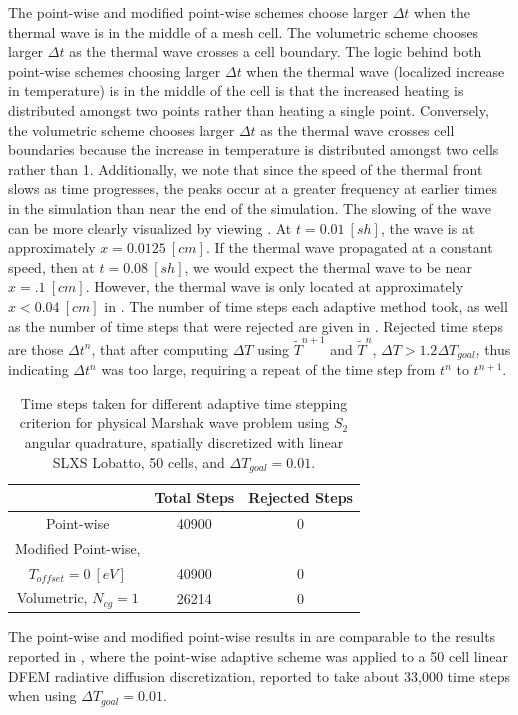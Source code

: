 The point-wise and modified point-wise schemes choose larger $\Delta t$ when the thermal wave is in the middle of a mesh cell.
The volumetric scheme chooses larger $\Delta t$ as the thermal wave crosses a cell boundary.
The logic behind both point-wise schemes choosing larger $\Delta t$ when the thermal wave (localized increase in temperature) is in the middle of the cell is that the increased heating is distributed amongst two points rather than heating a single point.
Conversely, the volumetric scheme chooses larger $\Delta t$ as the thermal wave crosses cell boundaries because the increase in temperature is distributed amongst two cells rather than 1.
Additionally, we note that since the speed of the thermal front slows as time progresses, the peaks occur at a greater frequency at earlier times in the simulation than near the end of the simulation.
The slowing of the wave can be more clearly visualized by viewing .
At $t=0.01 ~[sh]$, the wave is at approximately $x=0.0125~[cm]$.
If the thermal wave propagated at a constant speed, then at $t=0.08~[sh]$, we would expect the thermal wave to be near $x= .1~[cm]$.  
However, the thermal wave is only located at approximately $x<0.04~[cm]$ in .
The number of time steps each adaptive method took, as well as the number of time steps that were rejected are given in . 
Rejected time steps are those $\Delta t^n$, that after computing $\Delta T$ using $\widetilde{T}^{n+1}$ and $\widetilde{T}^n$, $\Delta T > 1.2 \Delta T_{goal}$, thus indicating $\Delta t^n$ was too large, requiring a repeat of the time step from $t^n$ to $t^{n+1}$.
\begin{table}[!htp]
\centering
\caption{Time steps taken for different adaptive time stepping criterion for physical Marshak wave problem using $S_2$ angular quadrature, spatially discretized with linear SLXS Lobatto, 50 cells, and $\Delta T_{goal} = 0.01$.}
\label{tbl:p1_steps}
\begin{tabular}{|c|c|c|}
\hline
{} &  Total Steps & Rejected Steps \\
\hline
Point-wise & 40900 & 0 \\
\hline
Modified Point-wise, &    &  \\
$T_{offset} = 0~[eV]$ &  40900  &  0\\
\hline
Volumetric, $N_{cg} = 1$ & 26214   & 0\\
\hline
\end{tabular}
\end{table}
The point-wise and modified point-wise results in  are comparable to the results reported in \cite{time_adaptive_diffusion}, where the point-wise adaptive scheme was applied to a 50 cell linear DFEM radiative diffusion discretization, reported to take about 33,000 time steps when using $\Delta T_{goal} = 0.01$.

